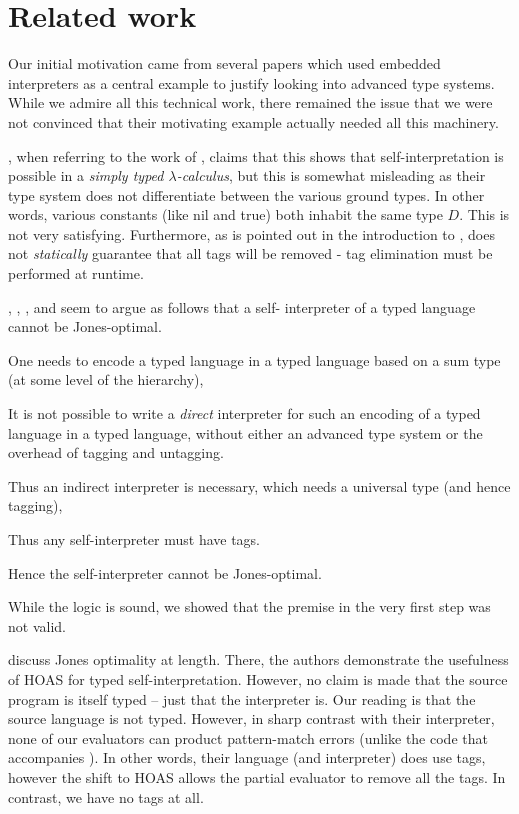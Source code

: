 \documentclass[preprint]{sigplanconf}
\begin{document}
\section{Related work}\label{related}

Our initial motivation came from several papers 
\citep{WalidICFP02,taha-tag,xi-guarded,peyton-jones-simple} which used
embedded interpreters as a central example to justify looking 
into advanced type systems.  While we admire all this technical work,
there remained the issue that we were not convinced that their 
motivating example actually needed all this machinery.

\citet{WalidICFP02}, when referring to the work of \citet{taha-tag},
claims that this shows that self-interpretation is possible in a
\emph{simply typed $\lambda$-calculus}, but this is somewhat misleading
as their type system does not differentiate between the various ground
types.  In other words, various constants (like \textsf{nil} and 
\textsf{true}) both inhabit the same type $D$.  This is not very satisfying.
Furthermore, as is pointed out in the introduction to \citet{WalidICFP02},
\citet{taha-tag} does not \emph{statically} guarantee that all tags will
be removed - tag elimination must be performed at runtime.

, \citet{taha-tag}, \citet{xi-guarded}, and
\citet{peyton-jones-simple} seem to argue as follows that a self\hyp
interpreter of a typed language cannot be Jones\hyp optimal.
\begin{enumerate*}
\item One needs to encode a typed language in a typed language based on
a sum type (at some level of the hierarchy),
\item It is not possible to write a \emph{direct} interpreter 
for such an encoding of a typed language
in a typed language, without either an
advanced type system or the overhead of tagging and untagging.
\item Thus an indirect interpreter is necessary, which needs a universal
  type (and hence tagging),
\item Thus any self-interpreter must have tags.
\item Hence the self-interpreter cannot be Jones-optimal.
\end{enumerate*}
While the logic is sound, we showed that the premise in the very first step
was not valid.

\citet{Danvy-tagging-encoding} discuss Jones optimality at length.
There, the authors demonstrate the usefulness of HOAS for typed
self-interpretation.  However, no claim is made that the source program
is itself typed -- just that the interpreter is.  Our reading is that
the source language is not typed.  However, in sharp contrast with 
their interpreter, none of our evaluators can product pattern-match errors
(unlike the code that accompanies \citet{Danvy-tagging-encoding}).
In other words, their language (and interpreter) does use tags, however
the shift to HOAS allows the partial evaluator to remove all the tags.
In contrast, we have no tags at all.
\end{document}
